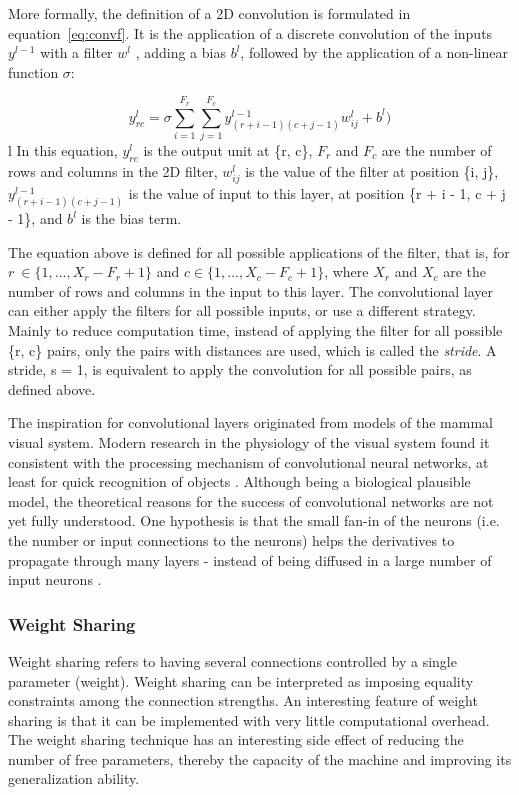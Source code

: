 \noindent More formally, the definition of a 2D convolution is formulated in equation~\ref{eq:convf}. It is the
application of a discrete convolution of the inputs $y^{l-1}$ with a filter $w^{l}$ , adding a bias $b^{l}$, followed by the application of a non-linear function $\sigma$:

\begin{equation}
y_{rc}^{l} =  \sigma \sum_{i=1}^{F_r}\sum_{j=1}^{F_c}  y_{(r+i-1)(c+j-1)}^{l-1} w_{ij}^{l} + b^{l})
\label{eq:convf}
\end{equation}
l
In this equation, $y_{rc}^{l}$ is the output unit at \{r, c\}, $F_r$ and $F_c$ are the number of rows and columns in the 2D filter, $w_{ij}^{l}$ is the value of the filter at position \{i, j\},  $y_{(r+i-1)(c+j-1)}^{l-1}$ is the value of input to this layer, at position \{r + i - 1, c + j - 1\}, and $b^{l}$ is the bias term.

The equation above is defined for all possible applications of the filter, that is, for $r~\in \{1, ..., X_r - F_r + 1\}$ and $c \in \{1, ..., X_c - F_c + 1\}$, where $X_r$ and $X_c$ are the number of rows and columns in the input to this layer. The convolutional layer can either apply the filters for all possible inputs, or use a different strategy. Mainly to reduce computation time, instead of applying the filter for all possible \{r, c\} pairs, only the pairs with distances are used, which is called the \textit{stride}. A stride, s = 1, is equivalent to apply the convolution for all possible pairs, as defined above. 

\noindent The inspiration for convolutional layers originated from models of the mammal visual system. Modern research in the physiology of the visual system found it consistent with the processing mechanism of convolutional neural networks, at least for quick recognition of objects \cite{bengio2009learning}. Although being a biological plausible model, the theoretical reasons for the success of convolutional networks are not yet fully understood. One hypothesis is that the small fan-in of the neurons (i.e. the number or input connections to the neurons) helps the derivatives to propagate through many layers - instead of being diffused in a large number of input neurons \cite{nips}.

\subsubsection{Weight Sharing}

Weight sharing refers to having several connections controlled by a single parameter (weight). Weight sharing can be interpreted as imposing equality constraints among the connection strengths. An interesting feature of weight sharing is that it can be implemented with very little computational overhead\cite{lecun1989generalization}. The weight sharing technique has an interesting side effect of reducing the number of free parameters, thereby the capacity of the machine and improving its generalization ability\cite{lecun2010convolutional}.



